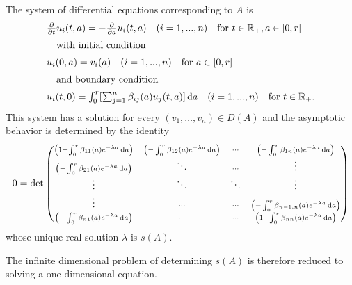 \begin{example}
The system of differential equations corresponding to $A$ is
\begin{equation} \label{eq:c4-3.13}
\begin{array}{l}
\frac{\partial}{\partial t}u_i(t,a) = - \frac{\partial}{\partial a}u_i(t,a) \quad (i=1,...,n) \quad \text{for } t\in\mathbb{R}_+, a\in[0,r]\\[2mm]
\quad \text{with initial condition} \\[2mm]
u_i(0,a) = v_i(a) \quad (i=1,...,n) \quad \text{for } a\in[0,r] \\[2mm]
\quad \text{and boundary condition} \\[2mm]
u_i(t,0) = \int_0^r [\sum_{j=1}^n \beta_{ij}(a)u_j(t,a)]\mathop{}\!\mathrm{d}{a} \quad (i=1,...,n) \quad \text{for } t\in\mathbb{R}_+.
\end{array}
\end{equation}
This system has a solution for every $(v_{1}, \ldots, v_{n}) \in D(A)$ and the asymptotic behavior is determined by the identity
\[
0 = \det
\begin{pmatrix}\scriptstyle{
 \left(1 - \int_{0}^{r} \beta_{11}(a)e^{-\lambda a} \mathop{}\!\mathrm{d}{a}\right)} 
  & \scriptstyle{ \left(-\int_{0}^{r} \beta_{12}(a)e^{-\lambda a} \mathop{}\!\mathrm{d}{a}\right)} 
  & \scriptstyle{\cdots} 
  & \scriptstyle{ \left(-\int_{0}^{r} \beta_{1n}(a)e^{-\lambda a} \mathop{}\!\mathrm{d}{a}\right)} \\
\scriptstyle{ \left(-\int_{0}^{r} \beta_{21}(a)e^{-\lambda a} \mathop{}\!\mathrm{d}{a}\right)} 
  & \scriptstyle{\ddots} 
  & \scriptstyle{\cdots}
  & \scriptstyle{\vdots} \\
\scriptstyle{\vdots}
  & \scriptstyle{\ddots}  
  & \scriptstyle{\ddots}   
  & \scriptstyle{\vdots}  \\
\vdots
  & \scriptstyle{\cdots}  
  & \scriptstyle{\cdots}
  & \scriptstyle{ \left(-\int_{0}^{r} \beta_{n-1,n}(a)e^{-\lambda a} \mathop{}\!\mathrm{d}{a}\right)} \\
\scriptstyle{ \left(-\int_{0}^{r} \beta_{n1}(a)e^{-\lambda a} \mathop{}\!\mathrm{d}{a}\right)} 
  & \scriptstyle{\cdots} 
  & \scriptstyle{\cdots}
  & \scriptstyle{ \left(1 - \int_{0}^{r} \beta_{nn}(a)e^{-\lambda a} \mathop{}\!\mathrm{d}{a}\right)}
\end{pmatrix}
\]
whose unique real solution $\lambda$ is $s(A)$.

The infinite dimensional problem of determining $s(A)$ is therefore reduced to solving a one-dimensional equation.
\end{example}

